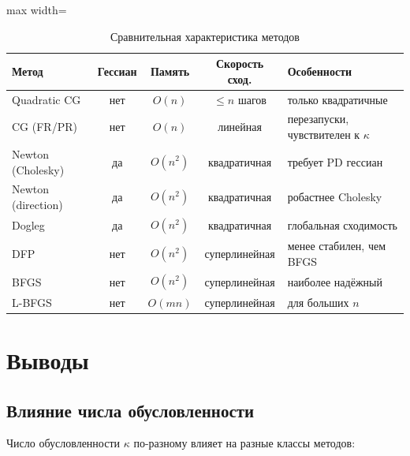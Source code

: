 \documentclass[12pt]{article}
\begin{document}
\begin{table}[H]
\centering
\caption{Сравнительная характеристика методов}
\begin{adjustbox}{max width=\textwidth}
\begin{tabular}{lcccl}
\toprule
\textbf{Метод} & \textbf{Гессиан} & \textbf{Память} & \textbf{Скорость сход.} & \textbf{Особенности} \\
\midrule
Quadratic CG & нет & $O(n)$ & $\leq n$ шагов & только квадратичные \\
CG (FR/PR) & нет & $O(n)$ & линейная & перезапуски, чувствителен к $\kappa$ \\
Newton (Cholesky) & да & $O(n^2)$ & квадратичная & требует PD гессиан \\
Newton (direction) & да & $O(n^2)$ & квадратичная & робастнее Cholesky \\
Dogleg & да & $O(n^2)$ & квадратичная & глобальная сходимость \\
DFP & нет & $O(n^2)$ & суперлинейная & менее стабилен, чем BFGS \\
BFGS & нет & $O(n^2)$ & суперлинейная & наиболее надёжный \\
L-BFGS & нет & $O(mn)$ & суперлинейная & для больших $n$ \\
\bottomrule
\end{tabular}
\end{adjustbox}
\end{table}

\section{Выводы}

\subsection*{Влияние числа обусловленности}

Число обусловленности $\kappa$ по-разному влияет на разные классы методов:
\end{document}
